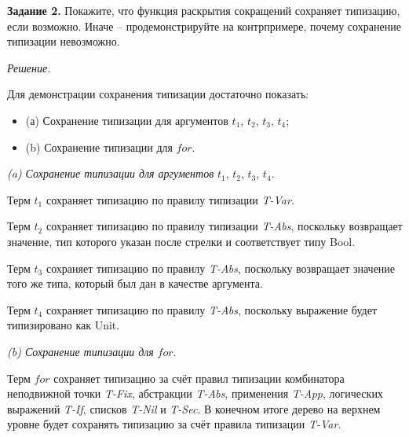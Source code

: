 \documentclass[landscape, 11pt]{report}
\begin{document}

	\textbf{Задание 2.} Покажите, что функция раскрытия сокращений сохраняет типизацию, если возможно. Иначе -- продемонстрируйте на контрпримере, почему сохранение типизации невозможно.

	\vspace{0.2cm}

	\textit{Решение.}

	\vspace{0.2cm}
	
	Для демонстрации сохранения типизации достаточно показать:
	
	\vspace{-0.2cm}
	
	\begin{itemize}
		\item[] (а) Сохранение типизации для аргументов $t_1$, $t_2$, $t_3$, $t_4$;
		\item[] (b) Сохранение типизации для $for$.
	\end{itemize} 	

	\textit{(a) Сохранение типизации для аргументов} $t_1$, $t_2$, $t_3$, $t_4$.

	\vspace{0.2cm}
	
	Терм $t_1$ сохраняет типизацию по правилу типизации \textit{T-Var}.
	
	Терм $t_2$ сохраняет типизацию по правилу типизации \textit{T-Abs}, поскольку возвращает значение, тип которого указан после стрелки и соответствует типу Bool.  
	
	Терм $t_3$ сохраняет типизацию по правилу \textit{T-Abs}, поскольку возвращает значение того же типа, который был дан в качестве аргумента.
	
	\newpage
	
	Терм $t_4$ сохраняет типизацию по правилу \textit{T-Abs}, поскольку выражение будет типизировано как Unit.
	
	\vspace{0.5cm}
	
	\textit{(b) Сохранение типизации для} $for$.

	\vspace{0.2cm}

	Терм $for$ сохраняет типизацию за счёт правил типизации комбинатора неподвижной точки \textit{T-Fix}, абстракции \textit{T-Abs}, применения \textit{T-App}, логических выражений \textit{T-If}, списков \textit{T-Nil} и \textit{T-Sec}. В конечном итоге дерево на верхнем уровне будет сохранять типизацию за счёт правила типизации \textit{T-Var}.
\end{document}
